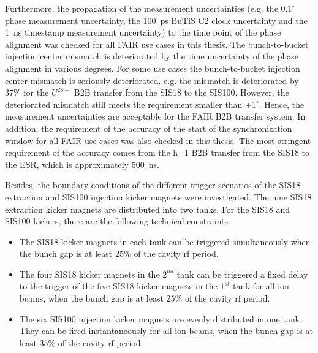 Furthermore, the propagation of the measurement uncertainties (e.g. the $0.1^\circ$ phase measurement uncertainty, the \SI{100}{ps} BuTiS C2 clock uncertainty and the \SI{1}{ns} timestamp measurement uncertainty) to the time point of the phase alignment was checked for all FAIR use cases in this thesis. The bunch-to-bucket injection center mismatch is deteriorated by the time uncertainty of the phase alignment in various degrees. For some use cases the bunch-to-bucket injection center mismatch is seriously deteriorated. e.g. the mismatch is deteriorated by $37\%$ for the $U^\mathit{28+}$ B2B transfer from the SIS18 to the SIS100. However, the deteriorated mismatch still meets the requirement smaller than $\pm1^\circ$. Hence, the measurement uncertainties are acceptable for the FAIR B2B transfer system. In addition, the requirement of the accuracy of the start of the synchronization window for all FAIR use cases was also checked in this thesis. The most stringent requirement of the accuracy comes from the h=1 B2B transfer from the SIS18 to the ESR, which is approximately \SI{500}{\ns}. 

Besides, the boundary conditions of the different trigger scenarios of the SIS18 extraction and SIS100 injection kicker magnets were investigated. The nine SIS18 extraction kicker magnets are distributed into two tanks. For the SIS18 and SIS100 kickers, there are the following technical constraints.
\begin{itemize}
	\item The SIS18 kicker magnets in each tank can be triggered simultaneously when the bunch gap is at least $25\%$ of the cavity rf period. 
	\item The four SIS18 kicker magnets in the $2^{nd}$ tank can be triggered a fixed delay to the trigger of the five SIS18 kicker magnets in the $1^{st}$ tank for all ion beams, when the bunch gap is at least $25\%$ of the cavity rf period. 
	\item The six SIS100 injection kicker magnets are evenly distributed in one tank. They can be fired instantaneously for all ion beams, when the bunch gap is at least $35\%$ of the cavity rf period.
\end{itemize}

